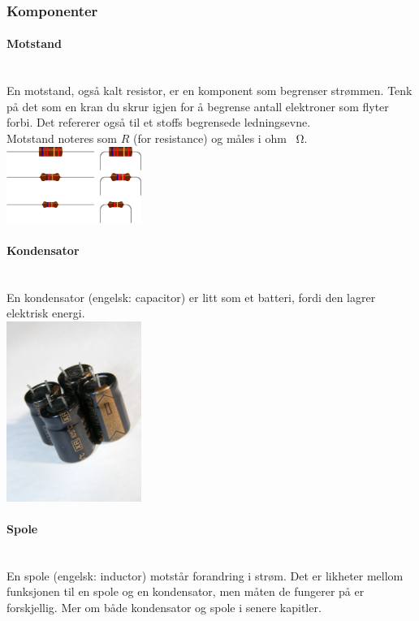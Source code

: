 \subsubsection{Komponenter}
\paragraph{Motstand} \mbox{} \\
En motstand, også kalt resistor, er en komponent som begrenser strømmen.
Tenk på det som en kran du skrur igjen for å begrense antall elektroner som flyter forbi.
Det refererer også til et stoffs begrensede ledningsevne.
\\
Motstand noteres som $R$ (for resistance) og måles i ohm \SI{}{\ohm}.
\\
\includegraphics[width=0.33\textwidth]{./img/resistor}

\paragraph{Kondensator} \mbox{} \\
En kondensator (engelsk: capacitor) er litt som et batteri,
fordi den lagrer elektrisk energi.
\\
\includegraphics[width=0.33\textwidth]{./img/kondensator}

\paragraph{Spole} \mbox{} \\
En spole (engelsk: inductor) motstår forandring i strøm.
Det er likheter mellom funksjonen til en spole og en kondensator, men måten de fungerer på er forskjellig.
Mer om både kondensator og spole i senere kapitler.
